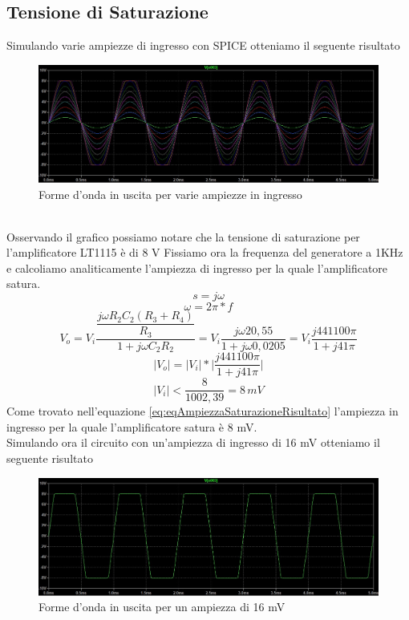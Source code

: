\subsection{Tensione di Saturazione}\label{subsec:saturazione}
Simulando varie ampiezze di ingresso con SPICE otteniamo il seguente risultato\\
\begin{figure}[h]
    \centering
    \includegraphics[width=1\textwidth]{Figure/SaturazioneAnalisi 1.8.1.jpg}
    \caption{Forme d'onda in uscita per varie ampiezze in ingresso}
    \label{fig:saturazione_analisi}
\end{figure}\\
Osservando il grafico possiamo notare che la tensione di saturazione per l'amplificatore LT1115 è di 8 V
\newline
Fissiamo ora la frequenza del generatore a 1KHz e calcoliamo analiticamente l'ampiezza di ingresso per la quale l'amplificatore satura.\\
$$s = j\omega$$ $$\omega = 2\pi * f$$
\begin{equation}\label{eq:eqAmpiezzaSaturazione}
V_{o} = V_{i}\dfrac{\dfrac{j\omega R_{2}C_{2}(R_{3}+R_{4})}{R_{3}}}{1+j\omega C_{2}R_{2}} = V_{i}\dfrac{j\omega20,55}{1 + j\omega0,0205} = V_{i}\dfrac{j441100\pi}{1 + j41\pi}
\end{equation}
\begin{equation}\label{eq:eqAmpiezzaSaturazioneModuli}
|V_{o}| = |V_{i}| * \big| \dfrac{j441100\pi}{1 + j41\pi} \big|
\end{equation}
\begin{equation}\label{eq:eqAmpiezzaSaturazioneRisultato}
|V_{i}| < \dfrac{8}{1002,39} = 8\hspace{2pt}mV
\end{equation}
Come trovato nell'equazione \ref{eq:eqAmpiezzaSaturazioneRisultato} l'ampiezza in ingresso per la quale l'amplificatore satura è 8 mV.\\
Simulando ora il circuito con un'ampiezza di ingresso di 16 mV otteniamo il seguente risultato
\begin{figure}[h]
    \centering
    \includegraphics[width=1\textwidth]{Figure/SaturazioneUscita 1.8.2.jpg}
    \caption{Forme d'onda in uscita per un ampiezza di 16 mV}
    \label{fig:saturazione_uscita}
\end{figure}\\